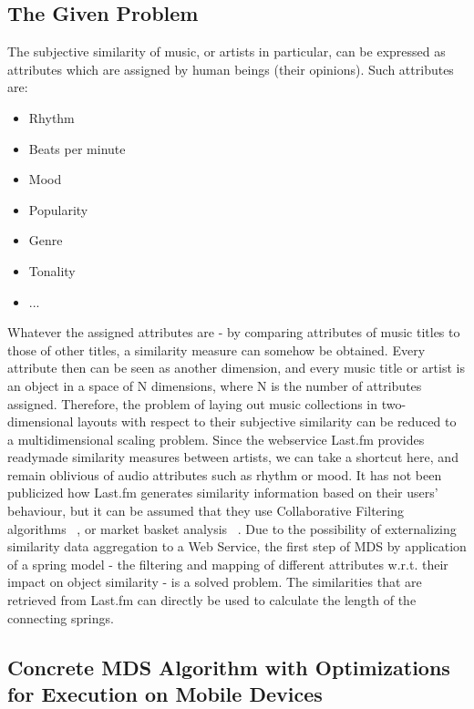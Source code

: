 \subsection{The Given Problem}

The subjective similarity of music, or artists in particular, can be expressed as attributes which are assigned by human beings (their opinions). Such attributes are:

\begin{itemize}
	\item Rhythm
	\item Beats per minute
	\item Mood
	\item Popularity
	\item Genre
	\item Tonality
	\item ...
\end{itemize}

Whatever the assigned attributes are - by comparing attributes of music titles to those of other titles, a similarity measure can somehow be obtained. Every attribute then can be seen as another dimension, and every music title or artist is an object in a space of N dimensions, where N is the number of attributes assigned. Therefore, the problem of laying out music collections in two-dimensional layouts with respect to their subjective similarity can be reduced to a multidimensional scaling problem.
Since the webservice Last.fm provides readymade similarity measures between artists, we can take a shortcut here, and remain oblivious of audio attributes such as rhythm or mood. It has not been publicized how Last.fm generates similarity information based on their users' behaviour, but it can be assumed that they use Collaborative Filtering algorithms ~\cite{Takacs:2007}, or market basket analysis ~\cite{Aggarwal99anew}. Due to the possibility of externalizing similarity data aggregation to a Web Service, the first step of MDS by application of a spring model - the filtering and mapping of different attributes w.r.t. their impact on object similarity - is a solved problem. The similarities that are retrieved from Last.fm can directly be used to calculate the length of the connecting springs.

\subsection{Concrete MDS Algorithm with Optimizations for Execution on Mobile Devices}
\label{subsec:contretemds}


